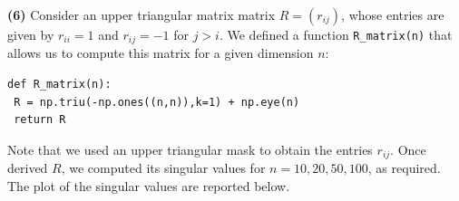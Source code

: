 \documentclass[a4paper,11pt]{article}
\begin{document}
\noindent \textbf{(6)} Consider an upper triangular matrix matrix $R = (r_{ij})$, whose entries are given by $r_{ii} = 1$ and $r_{ij} = -1$ for $j>i$. We defined a function \texttt{R_matrix(n)} that allows us to compute this matrix for a given dimension $n$:
\begin{verbatim}
def R_matrix(n):
 R = np.triu(-np.ones((n,n)),k=1) + np.eye(n)
 return R
\end{verbatim}
Note that we used an upper triangular mask to obtain the entries $r_{ij}$. Once derived $R$, we computed its singular values for $n = 10,20,50,100$, as required. The plot of the singular values are reported below. 
\begin{figure}[H]
	\centering
	 \qquad {} \\

\end{figure}
\end{document}
